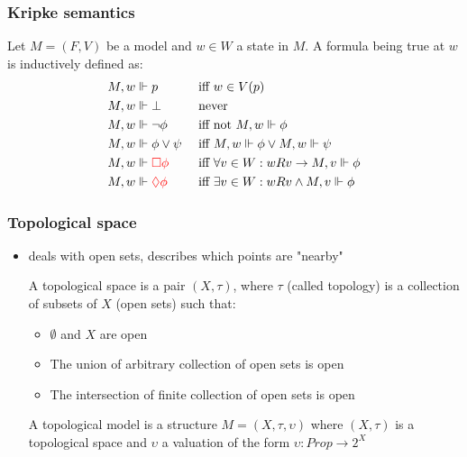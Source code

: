 \documentclass[hyperref={pdfpagelabels=false},t,10pt]{beamer}
\begin{document}
\begin{frame}
  \frametitle{Kripke semantics}

  \begin{definition}
      Let $M = (F,V)$ be a model and $w \in W$ a state in $M$. A formula being true at $w$ is inductively defined as: 
      \begin{align*}
        M, w &\Vdash p &&\text{ iff } w \in V(p) \\
        M, w &\Vdash \bot  &&\text{ never } \\
        M, w &\Vdash \neg \phi &&\text{ iff not } M, w \Vdash \phi \\ 
        M, w &\Vdash \phi \lor \psi &&\text{ iff } M,w \Vdash \phi \lor M,w \Vdash \psi \\
        M, w &\Vdash \textcolor{red}{\Box \phi} &&\text{ iff } \forall v \in W : wRv \rightarrow M, v \Vdash \phi \\
        M, w &\Vdash \textcolor{red}{\lozenge \phi} &&\text{ iff } \exists v \in W : wRv \land M,v \Vdash \phi
    \end{align*}  
  \end{definition}


  
\end{frame}



\begin{frame}
  \frametitle{Topological space}
  \begin{itemize}
    \item deals with open sets, describes which points are "nearby" \pause %
    \begin{definition}
             A topological space is a pair $(X, \tau)$, where $\tau$ (called topology) is a collection of subsets of $X$ (open sets) such that: \pause
        \begin{itemize}
          \item $\emptyset$ and $X$ are open
          \item The union of arbitrary collection of open sets is open
          \item The intersection of finite collection of open sets is open
        \end{itemize} \pause
          A topological model is a structure $M = (X,\tau, \upsilon)$ where $(X, \tau)$ is a topological space and $\upsilon$ a valuation of the form $\upsilon : Prop \rightarrow 2^X$  
    \end{definition}
    \end{itemize}
    \end{frame}
\end{document}
